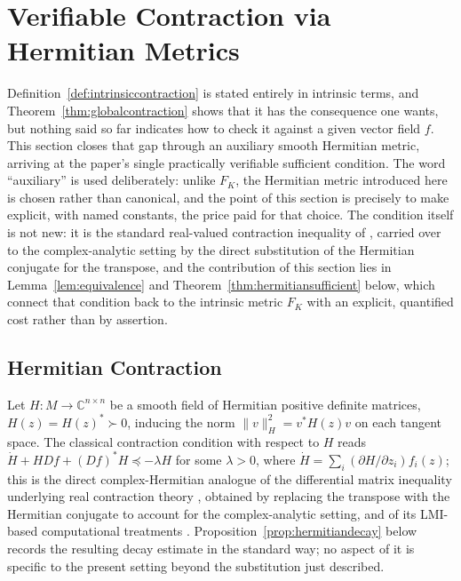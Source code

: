\documentclass[preprint,12pt,authoryear]{elsarticle}
\begin{document}
%
%
%

\section{Verifiable Contraction via Hermitian Metrics}
\label{sec:hermitian}

Definition~\ref{def:intrinsiccontraction} is stated entirely in intrinsic terms, and Theorem~\ref{thm:globalcontraction} shows that it has the consequence one wants, but nothing said so far indicates how to check it against a given vector field $f$. This section closes that gap through an auxiliary smooth Hermitian metric, arriving at the paper's single practically verifiable sufficient condition. The word ``auxiliary'' is used deliberately: unlike $F_K$, the Hermitian metric introduced here is chosen rather than canonical, and the point of this section is precisely to make explicit, with named constants, the price paid for that choice. The condition itself is not new: it is the standard real-valued contraction inequality of \cite{lohmiller1998contraction}, carried over to the complex-analytic setting by the direct substitution of the Hermitian conjugate for the transpose, and the contribution of this section lies in Lemma~\ref{lem:equivalence} and Theorem~\ref{thm:hermitiansufficient} below, which connect that condition back to the intrinsic metric $F_K$ with an explicit, quantified cost rather than by assertion.

\subsection{Hermitian Contraction}

Let $H:M\to\mathbb{C}^{n\times n}$ be a smooth field of Hermitian positive definite matrices, $H(z)=H(z)^*\succ0$, inducing the norm $\|v\|_H^2=v^*H(z)v$ on each tangent space. The classical contraction condition with respect to $H$ reads $\dot H+HDf+(Df)^*H\preceq-\lambda H$ for some $\lambda>0$, where $\dot H=\sum_i(\partial H/\partial z_i)f_i(z)$; this is the direct complex-Hermitian analogue of the differential matrix inequality underlying real contraction theory \cite{lohmiller1998contraction}, obtained by replacing the transpose with the Hermitian conjugate to account for the complex-analytic setting, and of its LMI-based computational treatments \cite{kawano2023lmi}. Proposition~\ref{prop:hermitiandecay} below records the resulting decay estimate in the standard way; no aspect of it is specific to the present setting beyond the substitution just described.
\end{document}
